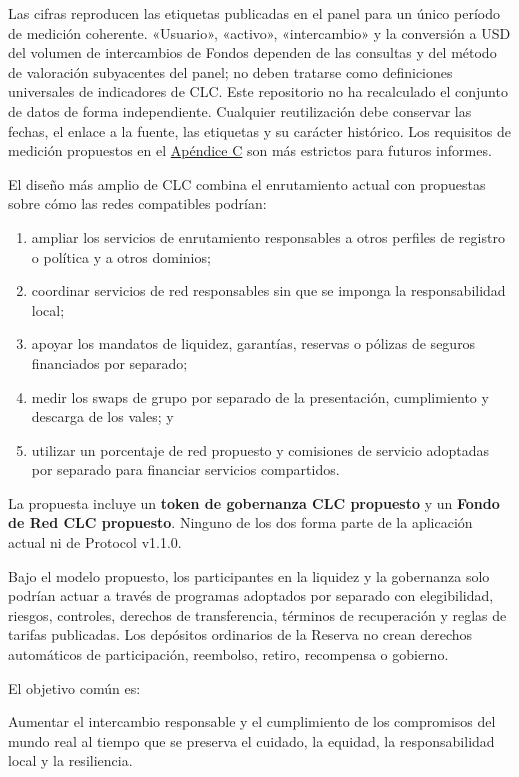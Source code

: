 \documentclass[11pt]{article}
\begin{document}
Las cifras reproducen las etiquetas publicadas en el panel para un único período de medición coherente. «Usuario», «activo», «intercambio» y la conversión a USD del volumen de intercambios de Fondos dependen de las consultas y del método de valoración subyacentes del panel; no deben tratarse como definiciones universales de indicadores de CLC. Este repositorio no ha recalculado el conjunto de datos de forma independiente. Cualquier reutilización debe conservar las fechas, el enlace a la fuente, las etiquetas y su carácter histórico. Los requisitos de medición propuestos en el \href{https://docs.cosmolocal.credit/es/white-paper/appendix-c-kpi-definitions}{Apéndice C} son más estrictos para futuros informes.

El diseño más amplio de CLC combina el enrutamiento actual con propuestas sobre cómo las redes compatibles podrían:

\begin{enumerate}[leftmargin=*]
\item ampliar los servicios de enrutamiento responsables a otros perfiles de registro o política y a otros dominios;
\item coordinar servicios de red responsables sin que se imponga la responsabilidad local;
\item apoyar los mandatos de liquidez, garantías, reservas o pólizas de seguros financiados por separado;
\item medir los swaps de grupo por separado de la presentación, cumplimiento y descarga de los vales; y
\item utilizar un porcentaje de red propuesto y comisiones de servicio adoptadas por separado para financiar servicios compartidos.
\end{enumerate}
La propuesta incluye un \textbf{token de gobernanza CLC propuesto} y un \textbf{Fondo de Red CLC propuesto}. Ninguno de los dos forma parte de la aplicación actual ni de Protocol v1.1.0.

Bajo el modelo propuesto, los participantes en la liquidez y la gobernanza solo podrían actuar a través de programas adoptados por separado con elegibilidad, riesgos, controles, derechos de transferencia, términos de recuperación y reglas de tarifas publicadas. Los depósitos ordinarios de la Reserva no crean derechos automáticos de participación, reembolso, retiro, recompensa o gobierno.

El objetivo común es:

Aumentar el intercambio responsable y el cumplimiento de los compromisos del mundo real al tiempo que se preserva el cuidado, la equidad, la responsabilidad local y la resiliencia.
\end{document}
